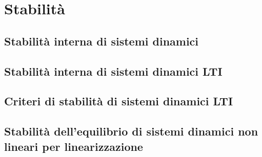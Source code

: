 \documentclass[../main.tex]{subfiles}
\begin{document}
\clearpage
\thispagestyle{empty}
\vspace*{7cm}
\section{Stabilità}
\vspace*{1.5cm}



\subsection{Stabilità interna di sistemi dinamici}


\subsection{Stabilità interna di sistemi dinamici LTI}


\subsection{Criteri di stabilità di sistemi dinamici LTI}

\subsection{Stabilità dell'equilibrio di sistemi dinamici non lineari per linearizzazione}
\end{document}
